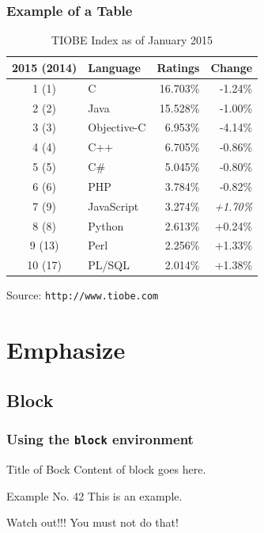 \documentclass[english,hangout]{beamer}
\begin{document}
\begin{frame}
 \frametitle{Example of a Table}
\begin{table}[ht]
 \begin{tabular}{clrr} \toprule
 2015 (2014)	& 	Language 	& Ratings 	& Change \\
 \midrule
1	(1)		& C		& 16.703\%	& -1.24\% \\
2	   (2)		& Java	& 15.528\%	& -1.00\% \\
3	   (3)		& Objective-C	& 6.953\%	& -4.14\% \\
4	   (4)		& C++	& 6.705\%	& -0.86\% \\
5	   (5)		& C\#		& 5.045\%	& -0.80\% \\
6	   (6)		& PHP	& 3.784\%	& -0.82\% \\
7	   (9)		& JavaScript	& 3.274\%	& \emph{+1.70\%} \\
8	   (8)		& Python	& 2.613\%	& +0.24\% \\
9	 (13)		& Perl	& 2.256\%	& +1.33\% \\
10	 (17)		& PL/SQL	& 2.014\%	& +1.38\% \\
\bottomrule
 \end{tabular}
 \caption{TIOBE Index as of January 2015}
\end{table}
\vspace{-3mm}
\tiny Source: \texttt{http://www.tiobe.com}
\end{frame}



\section{Emphasize}

\subsection{Block}

\begin{frame}
 \frametitle{Using the \texttt{block} environment}
\begin{block}{Title of Bock}
  Content of block goes here.
\end{block}

\begin{exampleblock}{Example No. 42}
  This is an example.
\end{exampleblock}
 
\begin{alertblock}{Watch out!!!}
  You must not do that!
\end{alertblock}
\end{frame}
\end{document}
